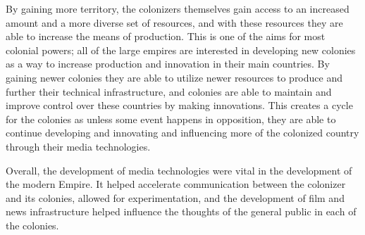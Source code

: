\documentclass[12pt, oneside]{article}
\begin{document}
\par By gaining more territory, the colonizers themselves gain access to an increased amount and a more diverse set of resources, and with these resources they are able to increase the means of production. This is one of the aims for most colonial powers; all of the large empires are interested in developing new colonies as a way to increase production and innovation in their main countries. By gaining newer colonies they are able to utilize newer resources to produce and further their technical infrastructure, and colonies are able to maintain and improve control over these countries by making innovations. This creates a cycle for the colonies as unless some event happens in opposition, they are able to continue developing and innovating and influencing more of the colonized country through their media technologies.
\par Overall, the development of media technologies were vital in the development of the modern Empire. It helped accelerate communication between the colonizer and its colonies, allowed for experimentation, and the development of film and news infrastructure helped influence the thoughts of the general public in each of the colonies. 
\end{document}

